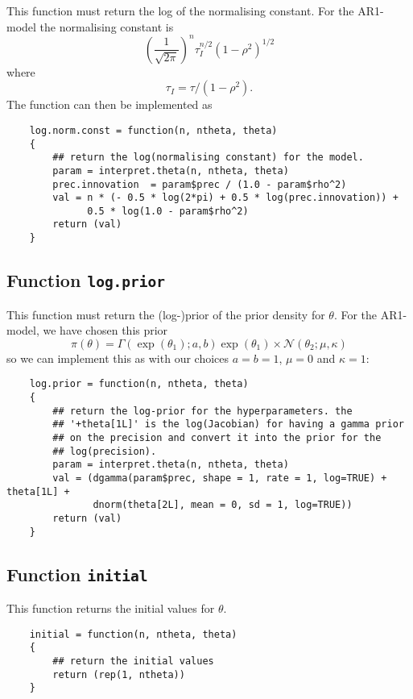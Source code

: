\documentclass[a4paper,11pt]{article}
\begin{document}
This function must return the log of the normalising constant. For the 
 AR1-model the normalising constant is 
\begin{displaymath}
    \left(\frac{1}{\sqrt{2\pi}}\right)^{n}
    \tau_{I}^{n/2} (1-\rho^{2})^{1/2}
\end{displaymath}
where
\begin{displaymath}
    \tau_{I} = \tau/(1-\rho^{2}).
\end{displaymath}
The function can then be implemented as
\begin{verbatim}
    log.norm.const = function(n, ntheta, theta)
    {
        ## return the log(normalising constant) for the model.
        param = interpret.theta(n, ntheta, theta)
        prec.innovation  = param$prec / (1.0 - param$rho^2)
        val = n * (- 0.5 * log(2*pi) + 0.5 * log(prec.innovation)) +
              0.5 * log(1.0 - param$rho^2)
        return (val)
    }
\end{verbatim}

\subsection*{Function \texttt{log.prior}}

This function must return the (log-)prior of the prior density for
$\theta$. For the AR1-model, we have chosen this prior
\begin{displaymath}
    \pi(\theta) = \Gamma(\exp(\theta_1); a,b) \exp(\theta_1) \times
    {\mathcal N}(\theta_{2}; \mu, \kappa)
\end{displaymath}
so we can implement this as with our choices $a=b=1$, $\mu=0$ and
$\kappa=1$:
\begin{verbatim}
    log.prior = function(n, ntheta, theta)
    {
        ## return the log-prior for the hyperparameters. the
        ## '+theta[1L]' is the log(Jacobian) for having a gamma prior
        ## on the precision and convert it into the prior for the
        ## log(precision).
        param = interpret.theta(n, ntheta, theta)
        val = (dgamma(param$prec, shape = 1, rate = 1, log=TRUE) + theta[1L] + 
               dnorm(theta[2L], mean = 0, sd = 1, log=TRUE))
        return (val)
    }
\end{verbatim}

\subsection*{Function \texttt{initial}}

This function returns the initial values for $\theta$.
\begin{verbatim}
    initial = function(n, ntheta, theta)
    {
        ## return the initial values
        return (rep(1, ntheta))
    }
\end{verbatim}
\end{document}
